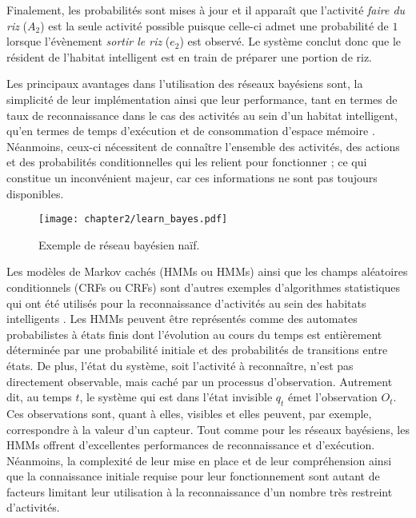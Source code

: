 \noindent Finalement, les probabilités sont mises à jour et il apparaît que l'activité \og \textit{faire du riz} \fg ($A_2$) est la seule activité possible puisque celle-ci admet une probabilité de $1$ lorsque l'évènement \og \textit{sortir le riz} \fg ($e_2$) est observé. Le système conclut donc que le résident de l'habitat intelligent est en train de préparer une portion de riz.

Les principaux avantages dans l'utilisation des réseaux bayésiens sont, la simplicité de leur implémentation ainsi que leur performance, tant en termes de taux de reconnaissance dans le cas des activités au sein d'un habitat intelligent, qu'en termes de temps d'exécution et de consommation d'espace mémoire \citep{Friedman1997}. Néanmoins, ceux-ci nécessitent de connaître l'ensemble des activités, des actions et des probabilités conditionnelles qui les relient  pour fonctionner ; ce qui constitue un inconvénient majeur, car ces informations ne sont pas toujours disponibles.

\begin{figure}[H]
	\centering
	\texttt{[image: chapter2/learn\_bayes.pdf]}
	\caption{Exemple de réseau bayésien naïf.}
	\label{fig:learn_bayes}
\end{figure}

Les modèles de Markov cachés (\aclp{HMM} ou \acsp{HMM}) ainsi que les champs aléatoires conditionnels (\aclp{CRF} ou \acsp{CRF}) sont d'autres exemples d'algorithmes statistiques qui ont été utilisés pour la reconnaissance d'activités au sein des habitats intelligents \citep{Oliver2004, Nazerfard2010, VanKasteren2011}. Les \acsp{HMM} peuvent être représentés comme des automates probabilistes à états finis dont l'évolution au cours du temps est entièrement déterminée par une probabilité initiale et des probabilités de transitions entre états. De plus, l'état du système, soit l'activité à reconnaître, n'est pas directement observable, mais caché par un processus d'observation. Autrement dit, au temps $t$, le système qui est dans l'état invisible $q_t$ émet l'observation $O_t$. Ces observations sont, quant à elles, visibles et elles peuvent, par exemple, correspondre à la valeur d'un capteur. Tout comme pour les réseaux bayésiens, les \acsp{HMM} offrent d'excellentes performances de reconnaissance et d'exécution. Néanmoins, la complexité de leur mise en place et de leur compréhension ainsi que la connaissance initiale requise pour leur fonctionnement sont autant de facteurs limitant leur utilisation à la reconnaissance d'un nombre très restreint d'activités.

